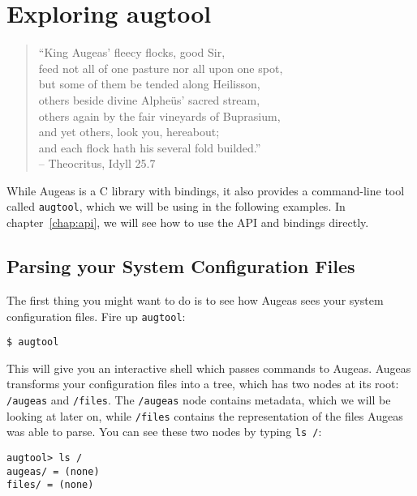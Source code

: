 \chapter{Exploring augtool}


\begin{verse}
``King Augeas’ fleecy flocks, good Sir, \\
feed not all of one pasture nor all upon one spot, \\
but some of them be tended along Heilisson, \\
others beside divine Alpheüs’ sacred stream, \\
others again by the fair vineyards of Buprasium, \\
and yet others, look you, hereabout; \\
and each flock hath his several fold builded.'' \\
\bigskip
\small{-- Theocritus, Idyll 25.7}
\end{verse}

While Augeas is a C library with bindings, it also provides a command-line tool called \verb!augtool!, which we will be using in the following examples. In chapter~\ref{chap:api}, we will see how to use the API and bindings directly.


\section{Parsing your System Configuration Files}

The first thing you might want to do is to see how Augeas sees your system configuration files. Fire up \verb!augtool!:

\begin{verbatim}
$ augtool
\end{verbatim}

This will give you an interactive shell which passes commands to Augeas. Augeas transforms your configuration files into a tree, which has two nodes at its root: \nolinkurl{/augeas} and \nolinkurl{/files}. The \nolinkurl{/augeas} node contains metadata, which we will be looking at later on, while \nolinkurl{/files} contains the representation of the files Augeas was able to parse. You can see these two nodes by typing \verb!ls /!:


\begin{verbatim}
augtool> ls /
augeas/ = (none)
files/ = (none)
\end{verbatim}

